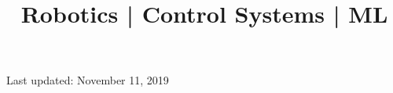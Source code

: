 \documentclass[10pt,a4paper]{moderncv}
\title{Robotics | Control Systems  | ML
	\newline
	\bf{\lb{\footnotesize
			Rerum Cognoscere Causas: To know the causes of things.} }}
\begin{document}
	\makecvtitle
	
	
	
	
	
	
	
	
	
	

	\footnotesize \centering Last updated: November 11, 2019
\clearpage
\end{document}
